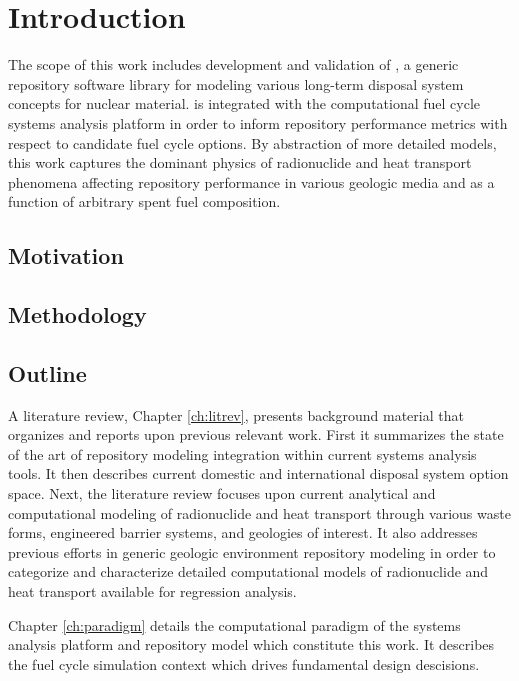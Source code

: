 \chapter{Introduction}\label{ch:introduction}


The scope of this work includes development and validation of \Cyder, a generic 
repository software library for modeling various long-term disposal system concepts 
for nuclear material. \Cyder is integrated with the \Cyclus 
computational fuel cycle systems analysis platform in order to inform 
repository performance metrics with respect to candidate fuel cycle options.  
By abstraction of more detailed models, this work captures the dominant physics 
of radionuclide and heat transport phenomena affecting repository performance 
in various geologic media and as a function of arbitrary spent fuel 
composition. 

\section{Motivation} 


\section{Methodology} 

\section{Outline}

A literature review, Chapter \ref{ch:litrev}, presents background material that organizes and 
reports upon previous relevant work. First it summarizes the state of the art of 
repository modeling integration within current systems analysis tools. It then 
describes current domestic and international disposal system option space. 
Next, the literature review focuses upon current analytical and 
computational modeling of radionuclide and heat transport through various waste 
forms, engineered barrier systems, and geologies of interest.  It also 
addresses previous efforts in generic geologic environment repository modeling in order to 
categorize and characterize detailed computational models of radionuclide and 
heat transport available for regression analysis.


Chapter \ref{ch:paradigm} details the computational paradigm of the \Cyclus 
systems analysis platform and \Cyder repository model which constitute this work. 
It describes the \Cyclus fuel cycle simulation context which drives fundamental 
\Cyder design descisions. 

